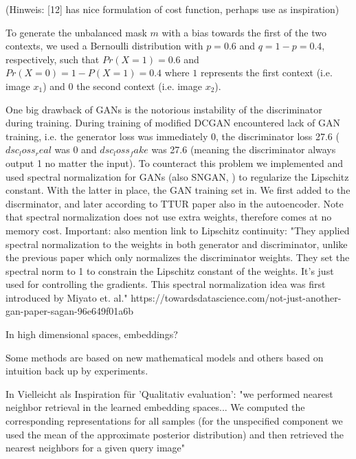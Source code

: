 \documentclass[12pt,a4paper]{article}
\begin{document}
(Hinweis: [12] has nice formulation of cost function, perhaps use as inspiration)

\par To generate the unbalanced mask $m$ with a bias towards the first of the two contexts, we used a Bernoulli distribution with $p=0.6$ and $q=1-p=0.4$, respectively, such that $Pr(X=1)=0.6$ and $Pr(X=0)=1-P(X=1)=0.4$ where $1$ represents the first context (i.e. image $x_1$) and $0$ the second context (i.e. image $x_2$).

\par One big drawback of GANs is the notorious instability of the discriminator during training. During training of modified DCGAN encountered lack of GAN training, i.e. the generator loss was immediately 0, the discriminator loss 27.6 ($dsc_loss_real$ was 0 and $dsc_loss_fake$ was 27.6 (meaning the discriminator always output 1 no matter the input). To counteract this problem we implemented and used spectral normalization for GANs (also SNGAN, \cite{1802.05957}) to regularize the Lipschitz constant. With the latter in place, the GAN training set in. We first added to the discrminator, and later according to TTUR paper also in the autoencoder. Note that spectral normalization does not use extra weights, therefore comes at no memory cost.
Important: also mention link to Lipschitz continuity: "They applied spectral normalization to the weights in both generator and discriminator, unlike the previous paper which only normalizes the discriminator weights. They set the spectral norm to 1 to constrain the Lipschitz constant of the weights. It’s just used for controlling the gradients. This spectral normalization idea was first introduced by Miyato et. al." https://towardsdatascience.com/not-just-another-gan-paper-sagan-96e649f01a6b

\par In high dimensional spaces, embeddings?

\par Some methods are based on new mathematical models and others based on intuition back up by experiments.

\par In \cite{1611.03383} Vielleicht als Inspiration für 'Qualitativ evaluation': "we performed nearest neighbor retrieval in the learned embedding spaces... We computed the corresponding representations for all samples (for the unspecified component we used the mean of the approximate posterior distribution) and then retrieved the nearest neighbors for a given query image"
\end{document}

